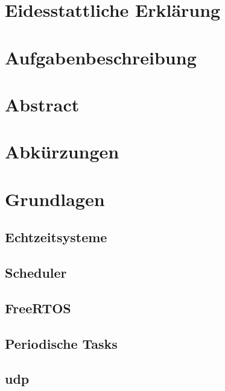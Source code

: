 \documentclass{scrartcl}
\begin{document}
	\begin{titlepage}
		
	\end{titlepage}
	\clearpage 
	\section*{Eidesstattliche Erklärung}
		
		\clearpage
	\section*{Aufgabenbeschreibung}
		
		\clearpage
	\section*{Abstract}
		
		\clearpage
	\tableofcontents
		\clearpage
	\section*{Abkürzungen}
		
		\clearpage
	\clearpage
	\section{Grundlagen} \label{section:grundlagen}
		
		\subsection{Echtzeitsysteme} \label{section:echtzeitsysteme}
			
		\subsection{Scheduler} \label{section:scheduler}
			
		\subsection{FreeRTOS} \label{section:freertos}
			
		\subsection{Periodische Tasks} \label{section:periodische_tasks}
			
		\subsection{\ac{udp}} \label{section:udp}
			
\end{document}
